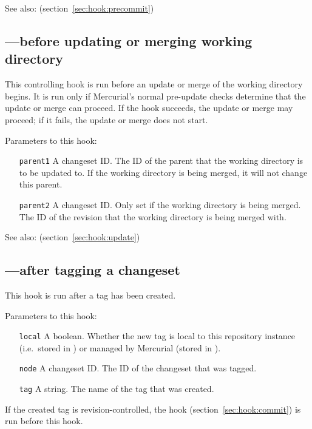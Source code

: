 See also:  (section~\ref{sec:hook:precommit})

\subsection{---before updating or merging working directory}
\label{sec:hook:preupdate}

This controlling hook is run before an update or merge of the working
directory begins.  It is run only if Mercurial's normal pre-update
checks determine that the update or merge can proceed.  If the hook
succeeds, the update or merge may proceed; if it fails, the update or
merge does not start.

Parameters to this hook:
\begin{itemize}
\item[\texttt{parent1}] A changeset ID.  The ID of the parent that the
  working directory is to be updated to.  If the working directory is
  being merged, it will not change this parent.
\item[\texttt{parent2}] A changeset ID.  Only set if the working
  directory is being merged.  The ID of the revision that the working
  directory is being merged with.
\end{itemize}

See also:  (section~\ref{sec:hook:update})

\subsection{---after tagging a changeset}
\label{sec:hook:tag}

This hook is run after a tag has been created.

Parameters to this hook:
\begin{itemize}
\item[\texttt{local}] A boolean.  Whether the new tag is local to this
  repository instance (i.e.~stored in ) or
  managed by Mercurial (stored in ).
\item[\texttt{node}] A changeset ID.  The ID of the changeset that was
  tagged.
\item[\texttt{tag}] A string.  The name of the tag that was created.
\end{itemize}

If the created tag is revision-controlled, the  hook
(section~\ref{sec:hook:commit}) is run before this hook.

